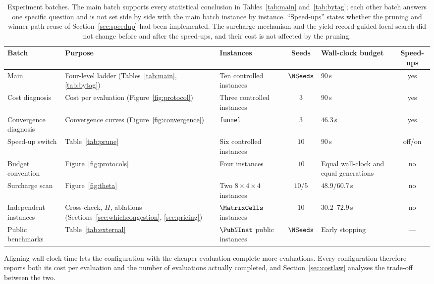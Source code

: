 \begin{table}[t]
\caption{Experiment batches. The main batch supports every statistical conclusion in Tables~\ref{tab:main} and~\ref{tab:bytag}; each other batch answers one specific question and is not set side by side with the main batch instance by instance.
``Speed-ups'' states whether the pruning and winner-path reuse of Section~\ref{sec:speedup} had been implemented. The surcharge mechanism and the yield-record-guided local search did not change before and after the speed-ups, and their cost is not affected by the pruning.}
\label{tab:batches}
\footnotesize
\begin{tabular}{@{}p{1.7cm}p{2.3cm}p{1.9cm}cp{1.6cm}c@{}}
\toprule
Batch & Purpose & Instances & Seeds & Wall-clock budget & Speed-ups \\
\midrule
Main & Four-level ladder (Tables~\ref{tab:main}, \ref{tab:bytag}) & Ten controlled instances & $\NSeeds$ & $90$\,s & yes \\
Cost diagnosis & Cost per evaluation (Figure~\ref{fig:protocol}) & Three controlled instances & $3$ & $90$\,s & yes \\
Convergence diagnosis & Convergence curves (Figure~\ref{fig:convergence}) & \texttt{funnel} & $3$ & $46.3$\,s & yes \\
Speed-up switch & Table~\ref{tab:prune} & Six controlled instances & $10$ & $90$\,s & off/on \\
Budget convention & Figure~\ref{fig:protocols} & Four instances & $10$ & Equal wall-clock and equal generations & no \\
Surcharge scan & Figure~\ref{fig:theta} & Two $8\times4\times4$ instances & $10$/$5$ & $48.9$/$60.7$\,s & no \\
Independent instances & Cross-check, $H$, ablations (Sections~\ref{sec:whichcongestion}, \ref{sec:pricing}) & $\MatrixCells$ instances & $10$ & $30.2$--$72.9$\,s & no \\
Public benchmarks & Table~\ref{tab:external} & $\PubNInst$ public instances & $\NSeeds$ & Early stopping & --- \\
\bottomrule
\end{tabular}
\end{table}

Aligning wall-clock time lets the configuration with the cheaper evaluation complete more evaluations.
Every configuration therefore reports both its cost per evaluation and the number of evaluations actually completed, and Section~\ref{sec:costlaw} analyses the trade-off between the two.

